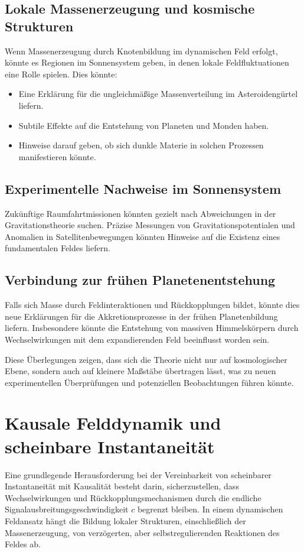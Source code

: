 \documentclass[a4paper,11pt]{article}
\begin{document}
	\subsection{Lokale Massenerzeugung und kosmische Strukturen}
	Wenn Massenerzeugung durch Knotenbildung im dynamischen Feld erfolgt, könnte es Regionen im Sonnensystem geben, in denen lokale Feldfluktuationen eine Rolle spielen. Dies könnte:
	\begin{itemize}
		\item Eine Erklärung für die ungleichmäßige Massenverteilung im Asteroidengürtel liefern.
		\item Subtile Effekte auf die Entstehung von Planeten und Monden haben.
		\item Hinweise darauf geben, ob sich dunkle Materie in solchen Prozessen manifestieren könnte.
	\end{itemize}
	
	\subsection{Experimentelle Nachweise im Sonnensystem}
	Zukünftige Raumfahrtmissionen könnten gezielt nach Abweichungen in der Gravitationstheorie suchen. Präzise Messungen von Gravitationspotentialen und Anomalien in Satellitenbewegungen könnten Hinweise auf die Existenz eines fundamentalen Feldes liefern.
	
	\subsection{Verbindung zur frühen Planetenentstehung}
	Falls sich Masse durch Feldinteraktionen und Rückkopplungen bildet, könnte dies neue Erklärungen für die Akkretionsprozesse in der frühen Planetenbildung liefern. Insbesondere könnte die Entstehung von massiven Himmelskörpern durch Wechselwirkungen mit dem expandierenden Feld beeinflusst worden sein.
	
	Diese Überlegungen zeigen, dass sich die Theorie nicht nur auf kosmologischer Ebene, sondern auch auf kleinere Maßstäbe übertragen lässt, was zu neuen experimentellen Überprüfungen und potenziellen Beobachtungen führen könnte.
	\section{Kausale Felddynamik und scheinbare Instantaneität}
	
	Eine grundlegende Herausforderung bei der Vereinbarkeit von scheinbarer Instantaneität mit Kausalität besteht darin, sicherzustellen, dass Wechselwirkungen und Rückkopplungsmechanismen durch die endliche Signalausbreitungsgeschwindigkeit $c$ begrenzt bleiben. In einem dynamischen Feldansatz hängt die Bildung lokaler Strukturen, einschließlich der Massenerzeugung, von verzögerten, aber selbstregulierenden Reaktionen des Feldes ab.
	
\end{document}
